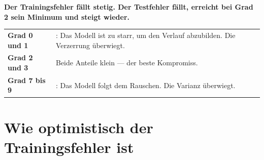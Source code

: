 \begin{merksatz}
\begin{center}
\begin{minipage}{0.9\textwidth}
\textbf{Der Trainingsfehler fällt stetig. Der Testfehler fällt, erreicht bei Grad 2 sein Minimum und steigt wieder.}
\end{minipage}
\end{center}

\begin{center}
{\small
\renewcommand{\arraystretch}{1.5}
\begin{tabular}{@{}P{2.6cm}P{6.0cm}@{}}
\toprule
\textbf{Grad 0 und 1} & : Das Modell ist zu starr, um den Verlauf abzubilden. Die Verzerrung überwiegt.\\
\textbf{Grad 2 und 3} & Beide Anteile klein --- der beste Kompromiss.\\
\textbf{Grad 7 bis 9} & : Das Modell folgt dem Rauschen. Die Varianz überwiegt.\\
\bottomrule
\end{tabular}}
\end{center}

\begin{center}
\begin{minipage}{0.88\textwidth}
\end{minipage}
\end{center}
\end{merksatz}

\section{Wie optimistisch der Trainingsfehler ist}

